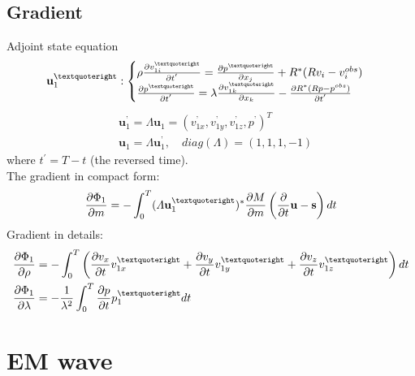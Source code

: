 \documentclass[pdftex,a4paper,parskip,listof=totoc,bibliography=totoc,onehalfspacing,12pt]{scrreprt}
\begin{document}
\section{Gradient}
Adjoint state equation
\begin{equation}
\label{eqn:AdjointEquation111}
\mathbf{u}_{1}^{’}:
\begin{cases}
\rho\pdv{v_{1i}^{’}}{t^{'}}=\pdv{p^{’}}{x_j} + R^{*}(R v_i -v_i^{obs})\\
\pdv{p^{’}}{t^{'}} = \lambda \pdv{v_{1k}^{’}}{x_k} - \pdv{R^{*}(R p - p^{obs})}{t^{'}}
\end{cases}
\end{equation}
\begin{equation}
\begin{align}
&\mathbf{u}_{1}^{’} = \varLambda \mathbf{u}_{1} = \left(v_{1x}^{’},v_{1y}^{’},v_{1z}^{’},p^{’}\right)^T \\
&\mathbf{u}_{1} = \varLambda \mathbf{u}_{1}^{’}, \quad diag(\varLambda) = \left(1,1,1,-1 \right)
\end{align}
\end{equation}
where $t^{'}=T-t$ (the reversed time).\\
The gradient in compact form:
\begin{equation}
 \pdv{\Phi_1}{m}=-\int_0^T (\varLambda \mathbf{u}_{1}^{’})^{*} \pdv{M}{m}\left( \pdv{}{t}\mathbf{u}-\mathbf{s} \right)dt
\end{equation}
Gradient in details:
\begin{align}
 \pdv{\Phi_1}{\rho}&= -\int_0^T \left( \pdv{v_x}{t} v_{1x}^{’} + \pdv{v_y}{t} v_{1y}^{’} + \pdv{v_z}{t} v_{1z}^{’} \right) dt\\
 \pdv{\Phi_1}{\lambda}&=- \frac{1}{\lambda^2}\int_0^T  \pdv{p}{t}p_1^{’} dt \\
\end{align}

\chapter{EM wave}
\label{sec:EM_wave_equation}
\end{document}
